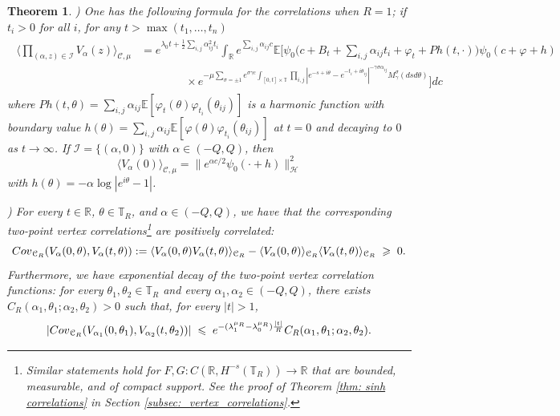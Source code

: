 \documentclass[11pt]{amsart}
\numberwithin{equation}{section}
\newtheorem{theorem}{Theorem}[section]
\theoremstyle{definition}
\renewcommand{\leq}{\;\leqslant\;}                   %
\renewcommand{\geq}{\;\geqslant\;}                   %
\newcommand{\R}{\mathbb{R}}
\newcommand{\cjd}{\rangle}
\newcommand{\cjg}{\langle}
\newcommand{\mc}{\mathcal}
\def\T{\mathbb{T}}
\begin{document}
\begin{theorem}
)
One has the following formula for the correlations when $R=1$; if $t_i >0$ for all $i$, for any $t>\max(t_1,\dots,t_n)$ 
\begin{align}
\begin{split}
 \Big\cjg \prod_{(\alpha,z)\in \mc{I}}V_{\alpha}(z)\Big\cjd_{\mc{C},\mu}   & =  e^{\lambda_0 t + \frac{1}{2}\sum_{i,j}\alpha_{ij}^2t_i} \int_\R e^{\sum_{i,j}\alpha_{ij} c}\mathbb{E}\big[\psi_0\big(c+B_t+\sum_{i,j} \alpha_{ij}t_i+ \varphi_t + Ph (t,\cdot))\psi_0(c+\varphi+h) 
\\
& \qquad \qquad \times e^{-\mu \sum_{\sigma = \pm 1} e^{\sigma\gamma c} \int_{[0,t]\times \T} \prod_{i,j} |e^{-s+i\theta}-e^{-t_i+i\theta_{ij}}|^{-\gamma \sigma \alpha_{ij}} M^\sigma_\gamma(dsd\theta)}\big ]dc
\end{split}
\end{align}
where $Ph(t,\theta) = \sum_{i,j} \alpha_{ij}\mathbb E[ \varphi_t(\theta) \varphi_{t_i}(\theta_{ij})]$ is a harmonic function with boundary value $h(\theta)= \sum_{i,j} \alpha_{ij}\mathbb E[ \varphi(\theta) \varphi_{t_i}(\theta_{ij})]$ at $t=0$ and decaying to $0$ as $t\to \infty$.
If $\mathcal{I}=\{(\alpha,0)\}$ with $\alpha\in (-Q,Q)$, then  \begin{equation} 
\label{vertex explicit}
\cjg V_{\alpha}(0)\cjd_{\mc{C},\mu} = \|e^{\alpha c/2} \psi_{0}(\cdot+h)\|^2_\mc{H}
\end{equation}
with $h(\theta)=-\alpha \log|e^{i\theta}-1|$.

\vspace{3mm}

) For every $t \in \mathbb R$, $\theta \in \mathbb T_R$, and $\alpha \in (-Q,Q)$, we have that the corresponding two-point vertex correlations\footnote{Similar statements hold for $F,G:C(\mathbb R, H^{-s}(\mathbb T_R))\to \R$ that are bounded, measurable, and of compact support. See the proof of Theorem \ref{thm: sinh correlations} in Section \ref{subsec:_vertex_correlations}.} are positively correlated:
\begin{equation}
{\rm Cov}_{\mathcal C_R}(V_\alpha(0,\theta), V_\alpha(t,\theta)):= \langle V_\alpha(0,\theta) V_\alpha(t,\theta) \rangle_{\mathcal C_R} - \langle V_\alpha(0,\theta) \rangle_{\mathcal C_R}\langle  V_\alpha(t,\theta) \rangle_{\mathcal C_R}\geq 0. 	
\end{equation}
Furthermore, we have exponential decay of the two-point vertex correlation functions: for every $\theta_1,\theta_2 \in \mathbb T_R$ and every $\alpha_1,\alpha_2 \in (-Q,Q)$, there exists $C_{R}(\alpha_1,\theta_1; \alpha_2,\theta_2)>0$ such that, for every $|t| > 1$,
\begin{equation}
|{\rm Cov}_{\mathcal C_R}(V_{\alpha_1}(0,\theta_1), V_{\alpha_2}(t,\theta_2))| \leq e^{-(\lambda_1^{\mu_R}-\lambda_0^{\mu_R})\frac{|t|}R} C_R(\alpha_1,\theta_1; \alpha_2,\theta_2).	
\end{equation}
\end{theorem}
\end{document}
